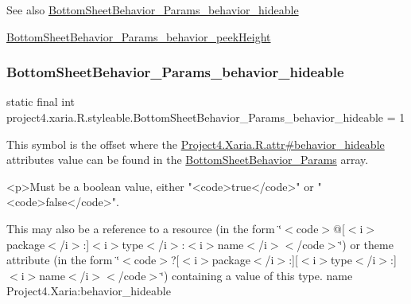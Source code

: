 \begin{DoxySeeAlso}{See also}
\hyperlink{classproject4_1_1xaria_1_1R_1_1styleable_a231009c3ef6da1d5c6c2953970a8d053}{Bottom\+Sheet\+Behavior\+\_\+\+Params\+\_\+behavior\+\_\+hideable} 

\hyperlink{classproject4_1_1xaria_1_1R_1_1styleable_a8e3e2f702f3e393d6ad11344e517a348}{Bottom\+Sheet\+Behavior\+\_\+\+Params\+\_\+behavior\+\_\+peek\+Height} 
\end{DoxySeeAlso}
\mbox{\label{classproject4_1_1xaria_1_1R_1_1styleable_a231009c3ef6da1d5c6c2953970a8d053}} 
\subsubsection{\texorpdfstring{Bottom\+Sheet\+Behavior\+\_\+\+Params\+\_\+behavior\+\_\+hideable}{BottomSheetBehavior\_Params\_behavior\_hideable}}
{\footnotesize\ttfamily static final int project4.\+xaria.\+R.\+styleable.\+Bottom\+Sheet\+Behavior\+\_\+\+Params\+\_\+behavior\+\_\+hideable = 1\hspace{0.3cm}{\ttfamily [static]}}

This symbol is the offset where the \hyperlink{}{Project4.\+Xaria.\+R.\+attr\#behavior\+\_\+hideable} attribute\textquotesingle{}s value can be found in the \hyperlink{classproject4_1_1xaria_1_1R_1_1styleable_ad80ceca30648e8c60ba2898c9560a573}{Bottom\+Sheet\+Behavior\+\_\+\+Params} array.

\begin{DoxyVerb}      <p>Must be a boolean value, either "<code>true</code>" or "<code>false</code>".
\end{DoxyVerb}
 

This may also be a reference to a resource (in the form \char`\"{}$<$code$>$@\mbox{[}$<$i$>$package$<$/i$>$\+:\mbox{]}$<$i$>$type$<$/i$>$\+:$<$i$>$name$<$/i$>$$<$/code$>$\char`\"{}) or theme attribute (in the form \char`\"{}$<$code$>$?\mbox{[}$<$i$>$package$<$/i$>$\+:\mbox{]}\mbox{[}$<$i$>$type$<$/i$>$\+:\mbox{]}$<$i$>$name$<$/i$>$$<$/code$>$\char`\"{}) containing a value of this type.  name Project4.\+Xaria\+:behavior\+\_\+hideable \mbox{\label{classproject4_1_1xaria_1_1R_1_1styleable_a8e3e2f702f3e393d6ad11344e517a348}} 
